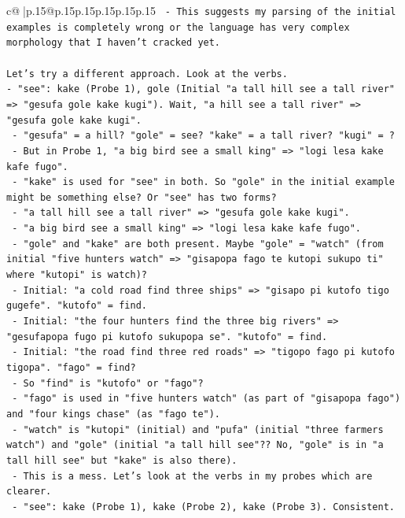 \documentclass{article}
\begin{document}
{\begin{supertabular}{c@{$\;$}|p{.15\linewidth}@{}p{.15\linewidth}p{.15\linewidth}p{.15\linewidth}p{.15\linewidth}p{.15\linewidth}}
{{{\texttt{  {-} This suggests my parsing of the initial examples is completely wrong or the language has very complex morphology that I haven't cracked yet.} \\
\\ 
\texttt{Let's try a different approach. Look at the verbs.} \\
\texttt{{-} "see": kake (Probe 1), gole (Initial "a tall hill see a tall river" => "gesufa gole kake kugi"). Wait, "a hill see a tall river" => "gesufa gole kake kugi".} \\
\texttt{  {-} "gesufa" = a hill? "gole" = see? "kake" = a tall river? "kugi" = ?} \\
\texttt{  {-} But in Probe 1, "a big bird see a small king" => "logi lesa kake kafe fugo".} \\
\texttt{  {-} "kake" is used for "see" in both. So "gole" in the initial example might be something else? Or "see" has two forms?} \\
\texttt{  {-} "a tall hill see a tall river" => "gesufa gole kake kugi".} \\
\texttt{  {-} "a big bird see a small king" => "logi lesa kake kafe fugo".} \\
\texttt{  {-} "gole" and "kake" are both present. Maybe "gole" = "watch" (from initial "five hunters watch" => "gisapopa fago te kutopi sukupo ti" where "kutopi" is watch)?} \\
\texttt{  {-} Initial: "a cold road find three ships" => "gisapo pi kutofo tigo gugefe". "kutofo" = find.} \\
\texttt{  {-} Initial: "the four hunters find the three big rivers" => "gesufapopa fugo pi kutofo sukupopa se". "kutofo" = find.} \\
\texttt{  {-} Initial: "the road find three red roads" => "tigopo fago pi kutofo tigopa". "fago" = find?} \\
\texttt{  {-} So "find" is "kutofo" or "fago"?} \\
\texttt{  {-} "fago" is used in "five hunters watch" (as part of "gisapopa fago") and "four kings chase" (as "fago te").} \\
\texttt{  {-} "watch" is "kutopi" (initial) and "pufa" (initial "three farmers watch") and "gole" (initial "a tall hill see"?? No, "gole" is in "a tall hill see" but "kake" is also there).} \\
\texttt{  {-} This is a mess. Let's look at the verbs in my probes which are clearer.} \\
\texttt{  {-} "see": kake (Probe 1), kake (Probe 2), kake (Probe 3). Consistent.} \\
}}}
\end{supertabular}}
\end{document}
